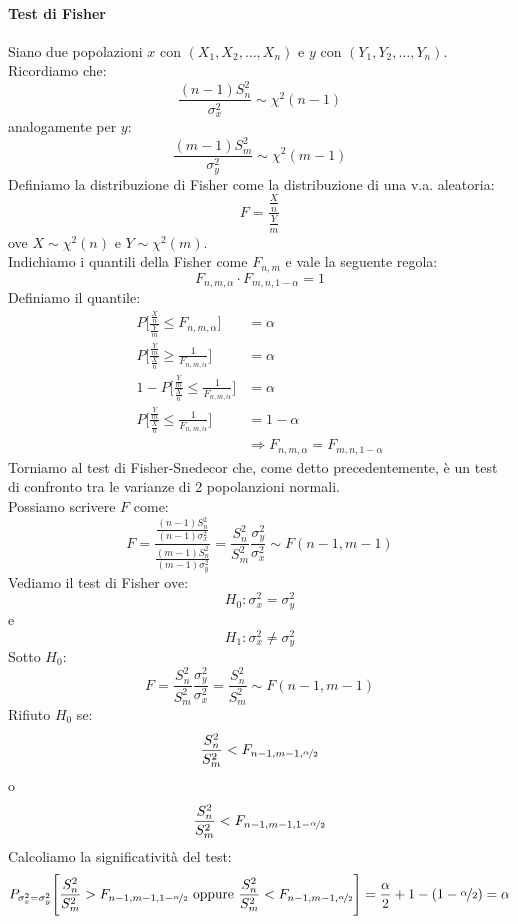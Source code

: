\documentclass[12pt]{report}
\begin{document}
		\paragraph{Test di Fisher} Siano due popolazioni $x$ con $(X_1, X_2, \dots, X_n)$ e $y$ con $(Y_1, Y_2, \dots, Y_n)$. \\
		Ricordiamo che:
		\[
		\frac{(n-1)S_n^2}{\sigma_x^2} \sim \chi^2(n-1)
		\]
		analogamente per $y$:
		\[
		\frac{(m-1)S_m^2}{\sigma_y^2} \sim \chi^2(m-1)
		\]
		Definiamo la distribuzione di Fisher come la distribuzione di una v.a. aleatoria:
		\[
		F = \frac{\frac{X}{n}}{\frac{Y}{m}}
		\]
		ove $X \sim \chi^2(n)$ e $Y \sim \chi^2(m)$. \\
		Indichiamo i quantili della Fisher come $F_{n, m}$ e vale la seguente regola:
		\[
		F_{n,m, \alpha} \cdot F_{m, n, 1 - \alpha} = 1
		\]
		Definiamo il quantile:
		\begin{align*}
		P\Bigg[\frac{\frac{X}{n}}{\frac{Y}{m}} \leq F_{n, m, \alpha}\Bigg] &= \alpha \\
		P\Bigg[\frac{\frac{Y}{m}}{\frac{X}{n}} \geq \frac{1}{F_{n, m, \alpha}}\Bigg] &= \alpha \\
		1 - P\Bigg[\frac{\frac{Y}{m}}{\frac{X}{n}} \leq \frac{1}{F_{n, m, \alpha}}\Bigg] &= \alpha \\
		P\Bigg[\frac{\frac{Y}{m}}{\frac{X}{n}} \leq \frac{1}{F_{n, m, \alpha}}\Bigg] &= 1 - \alpha \\
		&\Rightarrow F_{n, m, \alpha} = F_{m, n, 1 - \alpha}
		\end{align*}
		Torniamo al test di Fisher-Snedecor che, come detto precedentemente, è un test di confronto tra le varianze di 2 popolanzioni normali. \\
		Possiamo scrivere $F$ come:
		\[
		F = \frac{\frac{(n-1)S_n^2}{(n-1)\sigma_x^2}}{\frac{(m-1)S_n^2}{(m-1)\sigma_y^2}} = \frac{S_n^2}{S_m^2}\frac{\sigma_y^2}{\sigma_x^2} \sim F(n-1, m-1)
		\]
		Vediamo il test di Fisher ove:
		\[
		H_0: \sigma_x^2 = \sigma_y^2
		\]
		e
		\[
		H_1: \sigma_x^2 \neq \sigma_y^2
		\]
		Sotto $H_0$:
		\[
		F = \frac{S_n^2}{S_m^2}\frac{\sigma_y^2}{\sigma_x^2} = \frac{S_n^2}{S_m^2} \sim F(n-1, m-1)
		\]
		Rifiuto $H_0$ se:
		\[
		\frac{S_n^2}{S_m^2} < F_{n-1, m-1, \nicefrac{\alpha}{2}}
		\]
		o
		\[
		\frac{S_n^2}{S_m^2} < F_{n-1, m-1, 1-\nicefrac{\alpha}{2}}
		\]
		Calcoliamo la significatività del test:
		\begin{align*}
			P_{\sigma_x^2 = \sigma_y^2}\Bigg[\frac{S_n^2}{S_m^2} > F_{n-1, m-1, 1 - \nicefrac{\alpha}{2}} \text{ oppure } \frac{S_n^2}{S_m^2} < F_{n-1, m-1, \nicefrac{\alpha}{2}}\Bigg] = \frac{\alpha}{2} + 1 - (1 - \nicefrac{\alpha}{2}) = \alpha
		\end{align*}
\end{document}
